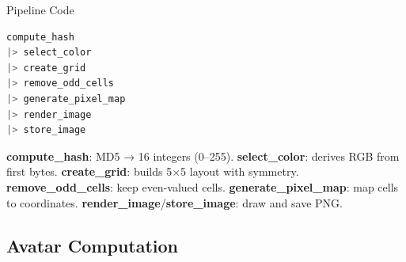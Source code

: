 \documentclass[aspectratio=169, table]{beamer}
\begin{document}
\begin{frame}[fragile]{Pipeline Code}
\vspace{20pt}
\begin{lstlisting}[language=Elixir]
compute_hash
|> select_color
|> create_grid
|> remove_odd_cells
|> generate_pixel_map
|> render_image
|> store_image
\end{lstlisting}

\small
\textbf{compute\_hash}: MD5 → 16 integers (0–255).  
\textbf{select\_color}: derives RGB from first bytes.  
\textbf{create\_grid}: builds 5×5 layout with symmetry.  
\textbf{remove\_odd\_cells}: keep even-valued cells.  
\textbf{generate\_pixel\_map}: map cells to coordinates.  
\textbf{render\_image}/\textbf{store\_image}: draw and save PNG.
\end{frame}

\subsection{Avatar Computation}
\end{document}
